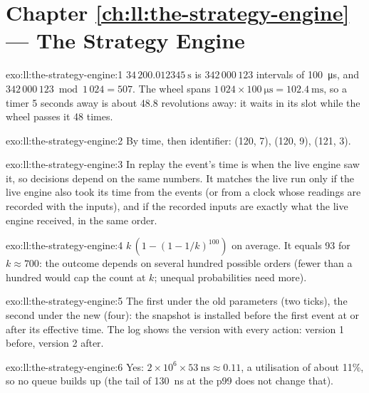 \section*{Chapter \ref{ch:ll:the-strategy-engine} --- The Strategy Engine}

\begin{solution}{exo:ll:the-strategy-engine:1}
$34\,200.012345~\text{s}$ is $342\,000\,123$ intervals of \qty{100}{\micro\second}, and $342\,000\,123 \bmod 1\,024 = 507$. The
wheel spans $1\,024 \times \qty{100}{\micro\second} = \qty{102.4}{\milli\second}$, so a timer 5 seconds away is about 48.8
revolutions away: it waits in its slot while the wheel passes it 48 times.
\end{solution}

\begin{solution}{exo:ll:the-strategy-engine:2}
By time, then identifier: (120, 7), (120, 9), (121, 3).
\end{solution}

\begin{solution}{exo:ll:the-strategy-engine:3}
In replay the event's time is when the live engine saw it, so decisions depend on the same numbers. It matches the live run only
if the live engine also took its time from the events (or from a clock whose readings are recorded with the inputs), and if
the recorded inputs are exactly what the live engine received, in the same order.
\end{solution}

\begin{solution}{exo:ll:the-strategy-engine:4}
$k\,(1 - (1 - 1/k)^{100})$ on average. It equals 93 for $k \approx 700$: the outcome depends on several hundred possible
orders (fewer than a hundred would cap the count at $k$; unequal probabilities need more).
\end{solution}

\begin{solution}{exo:ll:the-strategy-engine:5}
The first under the old parameters (two ticks), the second under the new (four): the snapshot is installed before the first
event at or after its effective time. The log shows the version with every action: version 1 before, version 2 after.
\end{solution}

\begin{solution}{exo:ll:the-strategy-engine:6}
Yes: $2 \times 10^6 \times \qty{53}{\nano\second} \approx 0.11$, a utilisation of about 11\%, so no queue builds up (the tail
of \qty{130}{\nano\second} at the p99 does not change that).
\end{solution}

